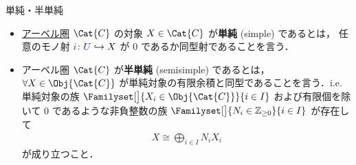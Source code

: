 \documentclass[TQFT_main]{subfiles}
\begin{document}
    \begin{mydef}[label=def:semisimple-cat]{単純・半単純}
        \begin{itemize}
            \item \hyperref[def:additive-cat]{アーベル圏} $\Cat{C}$ の対象 $X \in \Cat{C}$ が\textbf{単純} (simple) であるとは，
            任意のモノ射 $\textcolor{blue}{i} \colon \textcolor{blue}{U} \hookrightarrow X$ が $0$ であるか同型射であることを言う．
            \item アーベル圏 $\Cat{C}$ が\textbf{半単純} (semisimple) であるとは，$\forall X \in \Obj{\Cat{C}}$ が単純対象の有限余積と同型であることを言う．i.e.
            単純対象の族 $\Familyset[\big]{X_i \in \Obj{\Cat{C}}}{i \in I}$ および有限個を除いて $0$ であるような非負整数の族 $\Familyset[\big]{N_i \in \mathbb{Z}_{\ge 0}}{i \in I}$ が存在して
            \begin{align}
                X \cong \bigoplus_{i \in I} N_i X_i
            \end{align}
            が成り立つこと．
        \end{itemize}
    \end{mydef}
\end{document}
